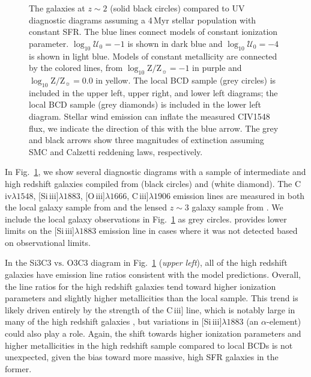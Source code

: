 \documentclass[preprint2]{aastex61}
\newcommand{\oiii}{[O\,{\sc iii}]\xspace}
\newcommand{\civ}{C\,{\sc iv}\xspace}
\newcommand{\SiuIII}{[Si\,{\sc iii}]\xspace}
\newcommand{\ciii}{C\,{\sc iii}]\xspace}
\newcommand\vs{\ensuremath{\mathrm{vs.}}\xspace}
\newcommand{\Myr}{$\,$Myr\xspace}
\newcommand{\logten}{\ensuremath{\log_{10}}}
\newcommand{\logZeq}[1]{\ensuremath{\logten \mathrm{Z}/\mathrm{Z}_{\sun} = #1}}
\newcommand{\logUeq}[1]{\ensuremath{\logten \mathcal{U}_0 = #1}}
\begin{document}
\begin{figure}
\begin{center}
    \caption{The \citet{Stark+2014} galaxies at $z{\sim}2$ (solid black circles) compared to UV diagnostic diagrams assuming a 4\Myr stellar population with constant SFR. The blue lines connect models of constant ionization parameter. \logUeq{-1} is shown in dark blue and \logUeq{-4} is shown in light blue. Models of constant metallicity are connected by the colored lines, from \logZeq{-1} in purple and \logZeq{0.0} in yellow. The \citet{Berg+2016} local BCD sample (grey circles) is included in the upper left, upper right, and lower left diagrams; the \citet{Senchyna+2017} local BCD sample (grey diamonds) is included in the lower left diagram. Stellar wind emission can inflate the measured C\textsc{IV}1548 flux, we indicate the direction of this with the blue arrow. The grey and black arrows show three magnitudes of extinction assuming SMC and Calzetti reddening laws, respectively.}
    \label{fig:dataHiZ}
  \end{center}
\end{figure}

In Fig.~\ref{fig:dataHiZ}, we show several diagnostic diagrams with a sample of intermediate and high redshift galaxies compiled from \citet{Stark+2014} (black circles) and \citet{Christensen+2012} (white diamond). The \civ$\lambda1548$, \SiuIII$\lambda1883$, \oiii$\lambda1666$, \ciii$\lambda1906$ emission lines are measured in both the local galaxy sample from \citet{Berg+2016} and the lensed $z{\sim}3$ galaxy sample from \citet{Stark+2014}. We include the local galaxy observations in Fig.~\ref{fig:dataHiZ} as grey circles. \citet{Stark+2015} provides lower limits on the \SiuIII$\lambda1883$ emission line in cases where it was not detected based on observational limits.

In the Si3C3 \vs O3C3 diagram in Fig.~\ref{fig:dataHiZ} (\emph{upper left}), all of the high redshift galaxies have emission line ratios consistent with the model predictions. Overall, the line ratios for the high redshift galaxies tend toward higher ionization parameters and slightly higher metallicities than the local sample. This trend is likely driven entirely by the strength of the \ciii line, which is notably large in many of the high redshift galaxies \citep{Stark+2014}, but variations in \SiuIII$\lambda1883$ (an $\alpha$-element) could also play a role. Again, the shift towards higher ionization parameters and higher metallicities in the high redshift sample compared to local BCDs is not unexpected, given the bias toward more massive, high SFR galaxies in the former.
\end{document}
